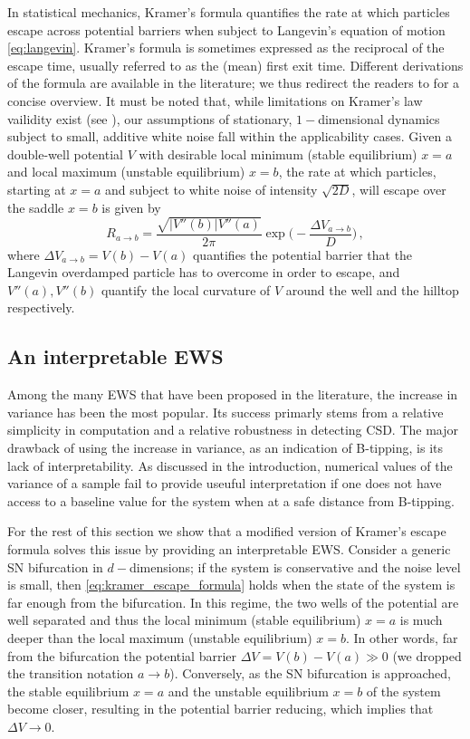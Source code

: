 \documentclass[10pt]{article}
\begin{document}
%
In statistical mechanics, Kramer's formula quantifies the rate at which particles escape across potential barriers when subject to Langevin's equation of motion \eqref{eq:langevin}.
Kramer's formula is sometimes expressed as the reciprocal of the escape time, usually referred to as the (mean) first exit time.
Different derivations of the formula are available in the literature; we thus redirect the readers to \cite{Berglund2013} for a concise overview.
It must be noted that, while limitations on Kramer's law vailidity exist (see \cite{Berglund2013}), our assumptions of stationary, $1-$dimensional dynamics subject to small, additive white noise fall within the applicability cases.
Given a double-well potential $V$ with desirable local minimum (stable equilibrium) $x=a$ and local maximum (unstable equilibrium) $x=b$, the rate at which particles, starting at $x=a$ and subject to white noise of intensity $\sqrt{2D}$, will escape over the saddle $x=b$ is given by
%
\begin{equation}\label{eq:kramer_escape_formula}
        R_{a\to b} = \frac{\sqrt{|V''(b)|V''(a)}}{2\pi}\exp\bigg(-\frac{\Delta V_{a\to b}}{D}\bigg)\,,
\end{equation}
%
where $\Delta V_{a\to b} = V(b) - V(a)$ quantifies the potential barrier that the Langevin overdamped particle has to overcome in order to escape, and $V''(a),V''(b)$ quantify the local curvature of $V$ around the well and the hilltop respectively.
%
\subsection{An interpretable EWS}\label{subsec:modified_escape_ews}
Among the many EWS that have been proposed in the literature, the increase in variance has been the most popular.
Its success primarly stems from a relative simplicity in computation and a relative robustness in detecting CSD.
The major drawback of using the increase in variance, as an indication of B-tipping, is its lack of interpretability.
As discussed in the introduction, numerical values of the variance of a sample fail to provide useuful interpretation if one does not have access to a baseline value for the system when at a safe distance from B-tipping.

For the rest of this section we show that a modified version of Kramer's escape formula solves this issue by providing an interpretable EWS.
Consider a generic SN bifurcation in $d-$dimensions; if the system is conservative and the noise level is small, then \eqref{eq:kramer_escape_formula} holds when the state of the system is far enough from the bifurcation.
In this regime, the two wells of the potential are well separated and thus the local minimum (stable equilibrium) $x=a$ is much deeper than the local maximum (unstable equilibrium) $x=b$.
In other words, far from the bifurcation the potential barrier $\Delta V = V(b) - V(a) \gg 0$ (we dropped the transition notation $a\to b$).
Conversely, as the SN bifurcation is approached, the stable equilibrium $x=a$ and the unstable equilibrium $x=b$ of the system become closer, resulting in the potential barrier reducing, which implies that $\Delta V\to0$.
\end{document}

